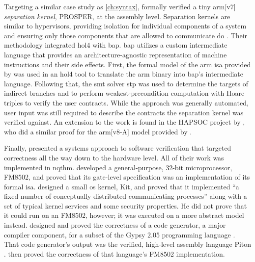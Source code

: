Targeting a similar case study as \cref{ch:syntax},
\textcite{dam2013hypervisor,dam2013formal}
formally verified a tiny \gls{arm}[v7] \emph{separation kernel},%
PROSPER, at the assembly level.
Separation kernels are similar to hypervisors,
providing isolation for individual components of a system and ensuring
only those components that are allowed to communicate do \autocite{rushby1981dvss}.
Their methodology integrated \gls{hol4} with \ac{bap}.
\Ac{bap} utilizes a custom intermediate language
that provides an architecture-agnostic representation of machine instructions
and their side effects.
First, the formal model of the \gls{arm} \ac{isa} provided by \textcite{fox2010arm} was used
in an \gls{hol4} tool to translate the \gls{arm} binary into \ac{bap}'s intermediate language.
Following that, the \ac{smt} solver \ac{stp}  \autocite{ganesh2007stp}
was used to determine the targets of indirect branches
and to perform weakest-precondition computation with Hoare triples
to verify the user contracts.
While the approach was generally automated,
user input was still required to describe the contracts
the separation kernel was verified against.
An extension to the work is found in the HAPSOC project by \textcite{baumann2016high},
who did a similar proof for the \gls{arm}[v8-A] model provided by \textcite{fox2015improved}.

Finally, \textcite{bevier1989approach} presented a systems approach
to software verification that targeted correctness
all the way down to the hardware level.
All of their work was implemented in \ac{nqthm}.
\Textcite{hunt1989microprocessor} developed a general-purpose, 32-bit microprocessor,
FM8502, and proved that its gate-level specification
was an implementation of its formal \ac{isa}.
\Textcite{bevier1989short,bevier1989kit,bevier1987verified}
designed a small \ac{os} kernel, Kit, and proved that it implemented
``a fixed number of conceptually distributed communicating processes''
along with a set of typical kernel services and some security properties.
He did not prove that it could run on an FM8502, however;
it was executed on a more abstract model instead.
\Textcite{young1989generator} designed and proved the correctness of a code generator,
a major compiler component, for a subset of the Gypsy 2.05 programming language
\autocite{good1986gypsy}. That code generator's output was
the verified, high-level assembly language Piton \autocite{moore1988piton}.
\Textcite{moore1989language} then proved the correctness
of that language's FM8502 implementation.

